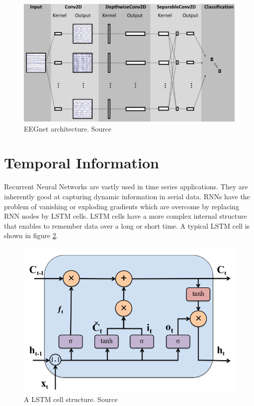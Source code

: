 \begin{figure}[H] 
    \includegraphics[height=0.6\textwidth]{images/eegnet_arch.png}
    \caption{EEGnet architecture. Source \cite{2018_EEGNet}}
    \label{fig:eegnet_arch}
\end{figure}

\section{Temporal Information}

Recurrent Neural Networks are vastly used in time series applications. They are inherently good at capturing dynamic information in serial data. RNNs have the problem of vanishing or exploding gradients which are overcome by replacing RNN nodes by LSTM cells. LSTM cells have a more complex internal structure that enables to remember data over a long or short time. A typical LSTM cell is shown in figure \ref{fig:lstm_cell}.

    \begin{figure}[H] 
        \includegraphics[height=0.6\textwidth]{images/lstm_cell.png}
        \caption{A LSTM cell structure. Source \cite{2018_DL_LSTM}}
        \label{fig:lstm_cell}
    \end{figure}
    
